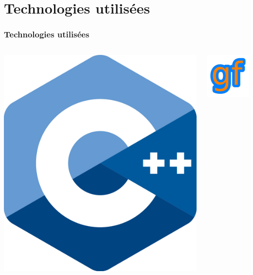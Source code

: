 \documentclass{beamer}
\begin{document}
\section{Technologies utilisées}

\begin{frame}
    \frametitle{Technologies utilisées}
    \begin{columns}
        \centering
        \includegraphics[width=\textwidth]{images/cpp.png} 
    
        \centering
        \includegraphics[width=\textwidth]{images/GF.png}


\end{columns}
\end{frame}
\end{document}
